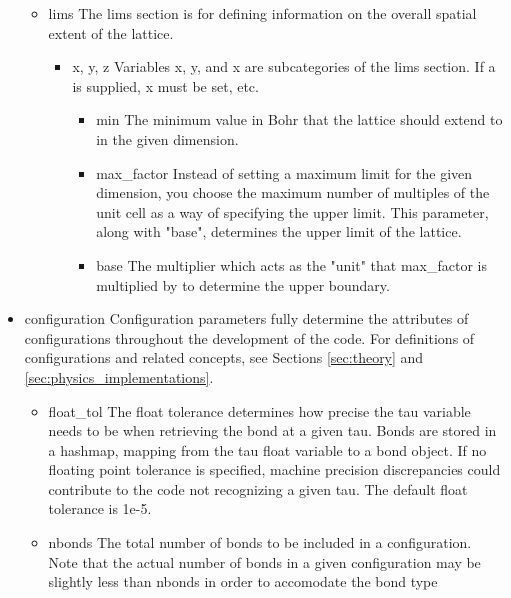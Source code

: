 \begin{itemize}
\begin{itemize}
      \item{lims}
        The lims section is for defining information on the overall spatial 
        extent of the lattice. 
        \begin{itemize}
          \item{x, y, z}
            Variables x, y, and x are subcategories of the lims section.
            If a is supplied, x must be set, etc. 
            \begin{itemize}
              \item{min}
                The minimum value in Bohr that the lattice should extend to in
                the given dimension.
              \item{max_factor}
                Instead of setting a maximum limit for the given dimension, you
                choose the maximum number of multiples of the unit cell as a 
                way of specifying the upper limit.  
                This parameter, along with "base", determines the upper limit 
                of the lattice.
              \item{base}
                The multiplier which acts as the "unit" that max_factor is 
                multiplied by to determine the upper boundary. 
            \end{itemize}
        \end{itemize}
    \end{itemize}
  \item{configuration}
    Configuration parameters fully determine the attributes of configurations
    throughout the development of the code. 
    For definitions of configurations and related concepts, see Sections
    \ref{sec:theory} and \ref{sec:physics_implementations}.
    \begin{itemize}
      \item{float_tol}
        The float tolerance determines how precise the tau variable needs to be
        when retrieving the bond at a given tau. 
        Bonds are stored in a hashmap, mapping from the tau float variable to a
        bond object. 
        If no floating point tolerance is specified, machine precision 
        discrepancies could contribute to the code not recognizing a given tau. 
        The default float tolerance is 1e-5. 
      \item{nbonds}
        The total number of bonds to be included in a configuration. 
        Note that the actual number of bonds in a given configuration may be 
        slightly less than nbonds in order to accomodate the bond type 

\end{itemize}
\end{itemize}
